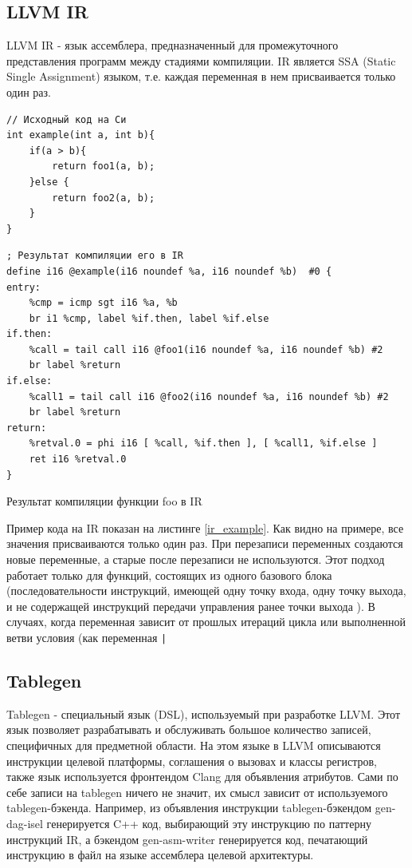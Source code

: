 \documentclass[a4paper,14pt]{extarticle}
\begin{document}
\subsection{LLVM IR}
LLVM IR - язык ассемблера, предназначенный для промежуточного представления программ между стадиями компиляции. IR является SSA (Static Single Assignment) языком, т.е. каждая переменная в нем присваивается только один раз. 
\begin{listing}[h!]
	\begin{verbatim}
// Исходный код на Си
int example(int a, int b){
	if(a > b){
		return foo1(a, b);
	}else {
		return foo2(a, b);
	}
}
	\end{verbatim}
	
	\begin{verbatim}
; Результат компиляции его в IR
define i16 @example(i16 noundef %a, i16 noundef %b)  #0 {
entry:
	%cmp = icmp sgt i16 %a, %b
	br i1 %cmp, label %if.then, label %if.else
if.then: 
	%call = tail call i16 @foo1(i16 noundef %a, i16 noundef %b) #2
	br label %return
if.else: 
	%call1 = tail call i16 @foo2(i16 noundef %a, i16 noundef %b) #2
	br label %return
return: 
	%retval.0 = phi i16 [ %call, %if.then ], [ %call1, %if.else ]
	ret i16 %retval.0
}
	\end{verbatim}
	\caption{Результат компиляции функции foo в IR}
	\label{ir_example}
\end{listing}

Пример кода на IR показан на листинге \ref{ir_example}. Как видно на примере, все значения присваиваются только один раз. При перезаписи переменных создаются новые переменные, а старые после перезаписи не используются. Этот подход работает только для функций, состоящих из одного базового блока (последовательности инструкций, имеющей одну точку входа, одну точку выхода, и не содержащей инструкций передачи управления ранее точки выхода \cite{contraol_flow_analysis}). В случаях, когда переменная зависит от прошлых итераций цикла или выполненной ветви условия  (как переменная \texttt|%

\subsection{Tablegen}
Tablegen - специальный язык (DSL), используемый при разработке LLVM. Этот язык позволяет разрабатывать и обслуживать большое количество записей, специфичных для предметной области. На этом языке в LLVM описываются инструкции целевой платформы, соглашения о вызовах и классы регистров, также язык используется фронтендом Clang для объявления атрибутов. Сами по себе записи на tablegen ничего не значит, их смысл зависит от используемого tablegen-бэкенда. Например, из объявления инструкции tablegen-бэкендом gen-dag-isel генерируется C++ код, выбирающий эту инструкцию по паттерну инструкций IR, а бэкендом gen-asm-writer генерируется код, печатающий инструкцию в файл на языке ассемблера целевой архитектуры\cite{llvm:tablegen}.
\end{document}
